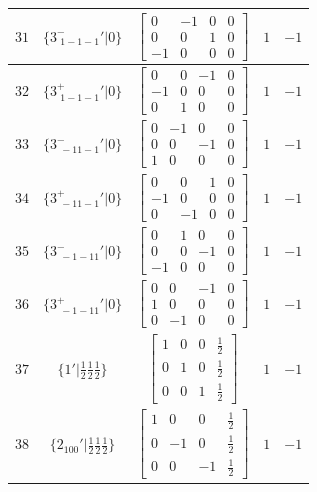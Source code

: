 \documentclass[fleqn,8pt]{jsarticle}
\begin{document}
\begin{longtable}{ccccc}
$ 31 $ & $ \{3^{-}_{\,\,1-1-1}{}'|0\} $ & $ \begin{bmatrix} 0 & -1 & 0 & 0 \\ 0 & 0 & 1 & 0 \\ -1 & 0 & 0 & 0 \end{bmatrix} $ & $ 1 $ & $ -1 $ \\ \hline
$ 32 $ & $ \{3^{+}_{\,\,1-1-1}{}'|0\} $ & $ \begin{bmatrix} 0 & 0 & -1 & 0 \\ -1 & 0 & 0 & 0 \\ 0 & 1 & 0 & 0 \end{bmatrix} $ & $ 1 $ & $ -1 $ \\ \hline
$ 33 $ & $ \{3^{-}_{\,\,-11-1}{}'|0\} $ & $ \begin{bmatrix} 0 & -1 & 0 & 0 \\ 0 & 0 & -1 & 0 \\ 1 & 0 & 0 & 0 \end{bmatrix} $ & $ 1 $ & $ -1 $ \\ \hline
$ 34 $ & $ \{3^{+}_{\,\,-11-1}{}'|0\} $ & $ \begin{bmatrix} 0 & 0 & 1 & 0 \\ -1 & 0 & 0 & 0 \\ 0 & -1 & 0 & 0 \end{bmatrix} $ & $ 1 $ & $ -1 $ \\ \hline
$ 35 $ & $ \{3^{-}_{\,\,-1-11}{}'|0\} $ & $ \begin{bmatrix} 0 & 1 & 0 & 0 \\ 0 & 0 & -1 & 0 \\ -1 & 0 & 0 & 0 \end{bmatrix} $ & $ 1 $ & $ -1 $ \\ \hline
$ 36 $ & $ \{3^{+}_{\,\,-1-11}{}'|0\} $ & $ \begin{bmatrix} 0 & 0 & -1 & 0 \\ 1 & 0 & 0 & 0 \\ 0 & -1 & 0 & 0 \end{bmatrix} $ & $ 1 $ & $ -1 $ \\ \hline
$ 37 $ & $ \{1{}'|\frac{1}{2} \frac{1}{2} \frac{1}{2}\} $ & $ \begin{bmatrix} 1 & 0 & 0 & \frac{1}{2} \\ 0 & 1 & 0 & \frac{1}{2} \\ 0 & 0 & 1 & \frac{1}{2} \end{bmatrix} $ & $ 1 $ & $ -1 $ \\ \hline
$ 38 $ & $ \{2{}_{100}{}'|\frac{1}{2} \frac{1}{2} \frac{1}{2}\} $ & $ \begin{bmatrix} 1 & 0 & 0 & \frac{1}{2} \\ 0 & -1 & 0 & \frac{1}{2} \\ 0 & 0 & -1 & \frac{1}{2} \end{bmatrix} $ & $ 1 $ & $ -1 $ \\ \hline

\end{longtable}
\end{document}
